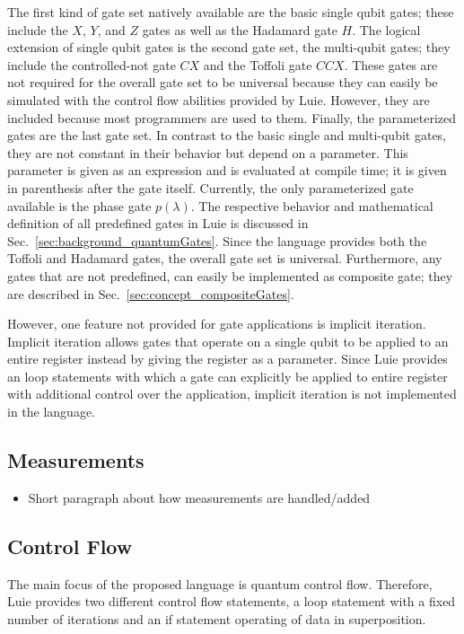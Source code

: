 The first kind of gate set natively available are the basic single qubit gates; these include the $X$, $Y$, and $Z$ gates as well as the Hadamard gate $H$. The logical extension of single qubit gates is the second gate set, the multi-qubit gates; they include the controlled-not gate $CX$ and the Toffoli gate $CCX$. These gates are not required for the overall gate set to be universal because they can easily be simulated with the control flow abilities provided by Luie. However, they are included because most programmers are used to them.
Finally, the parameterized gates are the last gate set. In contrast to the basic single and multi-qubit gates, they are not constant in their behavior but depend on a parameter. This parameter is given as an expression and is evaluated at compile time; it is given in parenthesis after the gate itself. Currently, the only parameterized gate available is the phase gate $p(\lambda)$.
The respective behavior and mathematical definition of all predefined gates in Luie is discussed in Sec.~\ref{sec:background_quantumGates}. Since the language provides both the Toffoli and Hadamard gates, the overall gate set is universal. Furthermore, any gates that are not predefined, can easily be implemented as composite gate; they are described in Sec.~\ref{sec:concept_compositeGates}.

However, one feature not provided for gate applications is implicit iteration. Implicit iteration allows gates that operate on a single qubit to be applied to an entire register instead by giving the register as a parameter. Since Luie provides an loop statements with which a gate can explicitly be applied to entire register with additional control over the application, implicit iteration is not implemented in the language.  

\subsection{Measurements}
\begin{itemize}
    \item Short paragraph about how measurements are handled/added
\end{itemize}

\subsection{Control Flow}
\label{sec:concept_controlFlow}
The main focus of the proposed language is quantum control flow. Therefore, Luie provides two different control flow statements, a loop statement with a fixed number of iterations and an if statement operating of data in superposition. 

